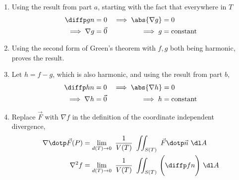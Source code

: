 \begin{enumerate}
\begin{enumerate}
              \item Using the result from part $ a $,
                    starting with the fact that everywhere in $ T $
                    \begin{align}
                        \diffp gn               & = 0               &
                        \implies \abs{\nabla g} & = 0                 \\
                        \implies \nabla g       & = \vec{0}         &
                        \implies g              & = \text{constant}
                    \end{align}
              \item Using the second form of Green's theorem with $ f, g $ both being
                    harmonic, proves the result.
              \item Let $ h = f - g $, which is also harmonic, and using the result from
                    part $ b $,
                    \begin{align}
                        \diffp hn               & = 0               &
                        \implies \abs{\nabla h} & = 0                 \\
                        \implies \nabla h       & = \vec{0}         &
                        \implies h              & = \text{constant}
                    \end{align}
              \item Replace $ \vec{F} $ with $ \nabla f $ in the definition of the
                    coordinate independent divergence,
                    \begin{align}
                        \nabla \dotp \vec{F}(P) & = \lim_{d(T) \to 0}
                        \ \frac{1}{V(T)}\ \iint_{S(T)}\ \vec{F} \dotp \vec{n}\ \dl A \\
                        \nabla^2 f              & = \lim_{d(T) \to 0}
                        \ \frac{1}{V(T)}\ \iint_{S(T)}\ \Biggl( \diffp fn
                        \Biggr)\ \dl A
                    \end{align}
          \end{enumerate}
\end{enumerate}